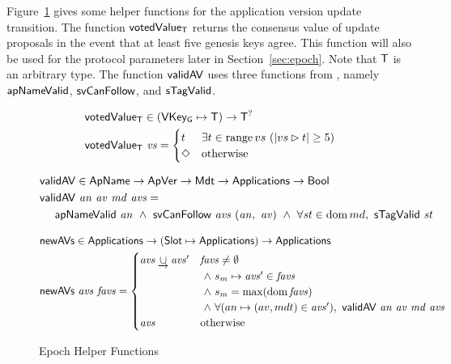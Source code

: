 \clearpage

Figure~\ref{fig:funcs:helper-updates} gives some helper functions for the
application version update transition.
The function $\mathsf{votedValue_T}$ returns
the consensus value of update proposals in the event that at least five
genesis keys agree.
This function will also be used for the protocol parameters later in Section~\ref{sec:epoch}.
Note that $\mathsf{T}$ is an arbitrary type.
The function $\mathsf{validAV}$ uses three functions from \cite{byron_ledger_spec}, namely
$\mathsf{apNameValid}$, $\mathsf{svCanFollow}$, and $\mathsf{sTagValid}$.

\begin{figure}[htb]
  \begin{align*}
      & \mathsf{votedValue_T} \in (\mathsf{VKey_G}\mapsto\mathsf{T}) \to \mathsf{T}^?\\
      & \mathsf{votedValue_T}~\mathit{vs} =
        \begin{cases}
          t & \exists t\in\operatorname{range}{vs}~(|vs\rhd t|\geq 5) \\
          \Diamond & \text{otherwise} \\
        \end{cases}
  \end{align*}

  \begin{align*}
      & \mathsf{validAV} \in \mathsf{ApName} \to \mathsf{ApVer} \to \mathsf{Mdt} \to \mathsf{Applications} \to \mathsf{Bool}\\
      & \mathsf{validAV}~\mathit{an}~\mathit{av}~\mathit{md}~\mathit{avs} = \\
      & ~~~~\mathsf{apNameValid}~\mathit{an}
        ~\land~\mathsf{svCanFollow}~\mathit{avs}~(\mathit{an},~\mathit{av})
        ~\land~\forall\mathit{st}\in\operatorname{dom}{md},~\mathsf{sTagValid}~\mathit{st}
  \end{align*}

  \begin{align*}
      & \mathsf{newAVs} \in \mathsf{Applications} \to (\mathsf{Slot}\mapsto\mathsf{Applications}) \to \mathsf{Applications} \\
      & \mathsf{newAVs}~\mathit{avs}~\mathit{favs} =
        \begin{cases}
          \mathit{avs}\mathbin{\underrightarrow\cup}\mathit{avs}'
                     & \mathit{favs}\neq\emptyset \\
                     & ~\land~s_m\mapsto\mathit{avs'}\in\mathit{favs} \\
                     & ~\land~s_m=\max(\operatorname{dom}{\mathit{favs}}) \\
                     & ~\land~\forall(an\mapsto(av, mdt)\in\mathit{avs}'),
                         ~\mathsf{validAV}~\mathit{an}~\mathit{av}~\mathit{md}~\mathit{avs}
          \\
          \mathit{avs} & \text{otherwise}
        \end{cases}
  \end{align*}

  \caption{Epoch Helper Functions}
  \label{fig:funcs:helper-updates}
\end{figure}



